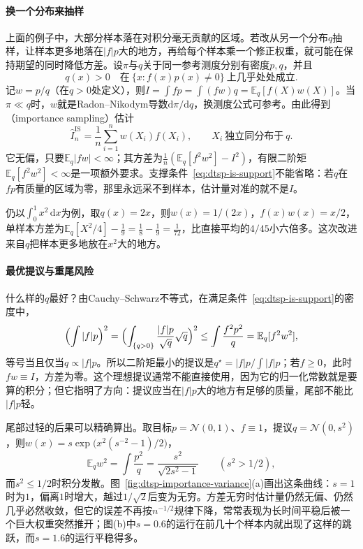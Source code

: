 \paragraph{换一个分布来抽样}
上面的例子中，大部分样本落在对积分毫无贡献的区域。若改从另一个分布$q$抽样，让样本更多地落在$|f|p$大的地方，再给每个样本乘一个修正权重，就可能在保持期望的同时降低方差。设$\pi$与$q$关于同一参考测度分别有密度$p,q$，并且
\begin{equation}
  q(x)>0\quad\text{在}\ \{x:f(x)p(x)\neq0\}\ \text{上几乎处处成立}.
  \label{eq:dtsp-is-support}
\end{equation}
记$w=p/q$（在$q>0$处定义），则$I=\int fp=\int(fw)q=\mathbb E_q[f(X)w(X)]$。当$\pi\ll q$时，$w$就是Radon--Nikodym导数$\mathrm d\pi/\mathrm dq$，换测度公式可参考。由此得到（importance sampling）估计
\begin{equation}
  \widehat I_n^{\mathrm{IS}}=\frac1n\sum_{i=1}^nw(X_i)f(X_i),\qquad X_i\ \text{独立同分布于}\ q.
  \label{eq:dtsp-importance-sampling}
\end{equation}
它无偏，只要$\mathbb E_q|fw|<\infty$；其方差为$\frac1n(\mathbb E_q[f^2w^2]-I^2)$，有限二阶矩$\mathbb E_q[f^2w^2]<\infty$是一项额外要求。支撑条件~\eqref{eq:dtsp-is-support}不能省略：若$q$在$fp$有质量的区域为零，那里永远采不到样本，估计量对准的就不是$I$。

仍以$\int_0^1x^2\,\mathrm dx$为例，取$q(x)=2x$，则$w(x)=1/(2x)$，$f(x)w(x)=x/2$，单样本方差为$\mathbb E_q[X^2/4]-\frac19=\frac18-\frac19=\frac1{72}$，比直接平均的$4/45$小六倍多。这次改进来自$q$把样本更多地放在$x^2$大的地方。

\paragraph{最优提议与重尾风险}
什么样的$q$最好？由Cauchy--Schwarz不等式，在满足条件~\eqref{eq:dtsp-is-support}的密度中，
\[
  \Bigl(\int|f|p\Bigr)^2=\Bigl(\int_{\{q>0\}}\frac{|f|p}{\sqrt q}\sqrt q\Bigr)^2\leq\int\frac{f^2p^2}{q}=\mathbb E_q[f^2w^2],
\]
等号当且仅当$q\propto|f|p$。所以二阶矩最小的提议是$q^\star=|f|p/\int|f|p$；若$f\geq0$，此时$fw\equiv I$，方差为零。这个理想提议通常不能直接使用，因为它的归一化常数就是要算的积分；但它指明了方向：提议应当在$|f|p$大的地方有足够的质量，尾部不能比$|f|p$轻。

尾部过轻的后果可以精确算出。取目标$p=\mathcal N(0,1)$、$f\equiv1$，提议$q=\mathcal N(0,s^2)$，则$w(x)=s\exp\bigl(x^2(s^{-2}-1)/2\bigr)$，
\[
  \mathbb E_qw^2=\int\frac{p^2}{q}=\frac{s^2}{\sqrt{2s^2-1}}\qquad(s^2>1/2),
\]
而$s^2\leq1/2$时积分发散。图~\ref{fig:dtsp-importance-variance}(a)画出这条曲线：$s=1$时为$1$，偏离$1$时增大，越过$1/\sqrt2$后变为无穷。方差无穷时估计量仍然无偏、仍然几乎必然收敛，但它的误差不再按$n^{-1/2}$规律下降，常常表现为长时间平稳后被一个巨大权重突然推开；图(b)中$s=0.6$的运行在前几十个样本内就出现了这样的跳跃，而$s=1.6$的运行平稳得多。

